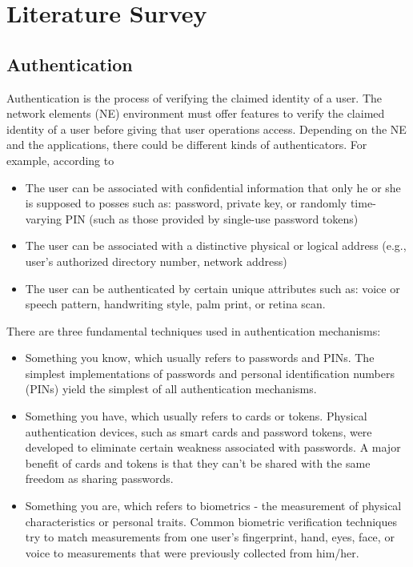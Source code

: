 \documentclass[12pt]{report}			%
\begin{document}
\newpage

\chapter{Literature Survey }
\section{ Authentication }
Authentication is the process of verifying the claimed identity of a user. The network elements (NE) environment must offer features to verify the claimed identity of a user before giving that user operations access. Depending on the NE and the applications, there could be different kinds of authenticators. For example, according to \cite{war02}
\begin{itemize}
\item The user can be associated with confidential information that only he or she is supposed to posses such as: password, private key, or randomly time-varying PIN (such as those provided by single-use password tokens) 
\item The user can be associated with a distinctive physical or logical address (e.g., user’s authorized directory number, network address)
\item The user can be authenticated by certain unique attributes such as: voice or speech pattern, handwriting style, palm print, or retina scan.
\end{itemize}
There are three fundamental techniques used in authentication mechanisms\cite{john03}:
\begin{itemize}
\item Something you know, which usually refers to passwords and PINs. The simplest implementations of passwords and personal identification numbers (PINs) yield the
simplest of all authentication mechanisms.
\item Something you have, which usually refers to cards or tokens. Physical authentication devices, such as smart cards and password tokens, were developed to eliminate certain weakness associated with passwords. A major benefit of cards and tokens is that they can’t be shared with the same freedom as sharing passwords.
\item Something you are, which refers to biometrics - the measurement of physical characteristics or personal traits. Common biometric verification techniques try to match measurements from one user’s fingerprint, hand, eyes, face, or voice to measurements that were previously collected from him/her.
\end{itemize}
\end{document}
